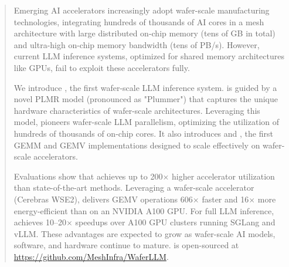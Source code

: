 \documentclass[letterpaper,twocolumn,10pt]{article}
\begin{document}
\begin{abstract}

Emerging AI accelerators increasingly adopt wafer-scale manufacturing technologies, integrating hundreds of thousands of AI cores in a mesh architecture with large distributed on-chip memory (tens of GB in total) and ultra-high on-chip memory bandwidth (tens of PB/s). However, current LLM inference systems, optimized for shared memory architectures like GPUs, fail to exploit these accelerators fully.

We introduce \sys, the first wafer-scale LLM inference system. \sys is guided by a novel PLMR model (pronounced as "Plummer") that captures the unique hardware characteristics of wafer-scale architectures. Leveraging this model, \sys pioneers wafer-scale LLM parallelism, optimizing the utilization of hundreds of thousands of on-chip cores. It also introduces \gemm and \gemv, the first GEMM and GEMV implementations designed to scale effectively on wafer-scale accelerators.

Evaluations show that \sys achieves up to 200$\times$ higher accelerator utilization than state-of-the-art methods. Leveraging a wafer-scale accelerator (Cerebras WSE2), \sys delivers GEMV operations 606$\times$ faster and 16$\times$ more energy-efficient than on an NVIDIA A100 GPU. For full LLM inference, \sys achieves 10–20$\times$ speedups over A100 GPU clusters running SGLang and vLLM. These advantages are expected to grow as wafer-scale AI models, software, and hardware continue to mature. \sys is open-sourced at \href{https://github.com/MeshInfra/WaferLLM}{https://github.com/MeshInfra/WaferLLM}.

\end{abstract}

















\clearpage



\end{document}
